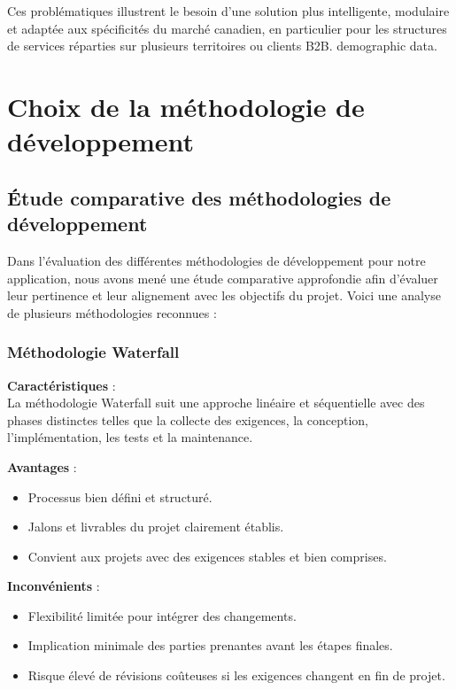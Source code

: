 \medskip

Ces problématiques illustrent le besoin d’une solution plus intelligente, modulaire et adaptée aux spécificités du marché canadien, en particulier pour les structures de services réparties sur plusieurs territoires ou clients B2B.
demographic data.\\[1mm]

\section{Choix de la méthodologie de développement}

\subsection{Étude comparative des méthodologies de développement}

Dans l’évaluation des différentes méthodologies de développement pour notre application, nous avons mené une étude comparative approfondie afin d’évaluer leur pertinence et leur alignement avec les objectifs du projet. Voici une analyse de plusieurs méthodologies reconnues :

\subsubsection*{Méthodologie Waterfall}
\textbf{Caractéristiques} :\\
La méthodologie Waterfall suit une approche linéaire et séquentielle avec des phases distinctes telles que la collecte des exigences, la conception, l'implémentation, les tests et la maintenance.

\textbf{Avantages} :
\begin{itemize}
    \item Processus bien défini et structuré.
    \item Jalons et livrables du projet clairement établis.
    \item Convient aux projets avec des exigences stables et bien comprises.
\end{itemize}

\textbf{Inconvénients} :
\begin{itemize}
    \item Flexibilité limitée pour intégrer des changements.
    \item Implication minimale des parties prenantes avant les étapes finales.
    \item Risque élevé de révisions coûteuses si les exigences changent en fin de projet.
\end{itemize}

